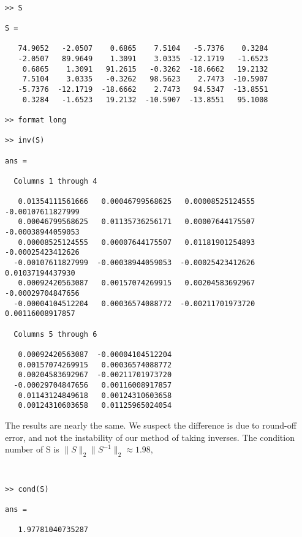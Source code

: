 \documentclass{article}
\begin{document}
{\tt
\begin{verbatim}
>> S
 
S =
 
   74.9052   -2.0507    0.6865    7.5104   -5.7376    0.3284
   -2.0507   89.9649    1.3091    3.0335  -12.1719   -1.6523
    0.6865    1.3091   91.2615   -0.3262  -18.6662   19.2132
    7.5104    3.0335   -0.3262   98.5623    2.7473  -10.5907
   -5.7376  -12.1719  -18.6662    2.7473   94.5347  -13.8551
    0.3284   -1.6523   19.2132  -10.5907  -13.8551   95.1008
 
>> format long

>> inv(S)
 
ans =
 
  Columns 1 through 4 
 
   0.01354111561666   0.00046799568625   0.00008525124555  -0.00107611827999
   0.00046799568625   0.01135736256171   0.00007644175507  -0.00038944059053
   0.00008525124555   0.00007644175507   0.01181901254893  -0.00025423412626
  -0.00107611827999  -0.00038944059053  -0.00025423412626   0.01037194437930
   0.00092420563087   0.00157074269915   0.00204583692967  -0.00029704847656
  -0.00004104512204   0.00036574088772  -0.00211701973720   0.00116008917857
 
  Columns 5 through 6 
 
   0.00092420563087  -0.00004104512204
   0.00157074269915   0.00036574088772
   0.00204583692967  -0.00211701973720
  -0.00029704847656   0.00116008917857
   0.01143124849618   0.00124310603658
   0.00124310603658   0.01125965024054
\end{verbatim}
}
The results are nearly the same.  We suspect the difference is due to
round-off error, and not the instability of our method of taking
inverses. The condition number of S is $\|S\|_2 \|S^{-1}\|_2 \approx 1.98$,
{\tt
\begin{verbatim}
>> cond(S)
 
ans =
 
   1.97781040735287
\end{verbatim}
}
\end{document}
